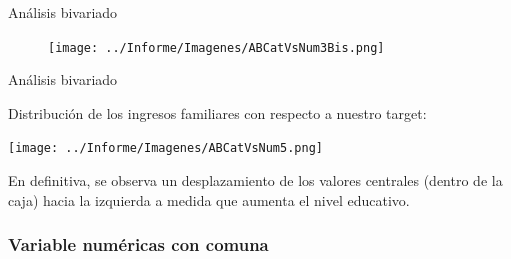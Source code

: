\documentclass[pdf]{beamer}
\begin{document}
{\begin{frame}{Análisis bivariado}
    \begin{figure}
        \texttt{[image: ../Informe/Imagenes/ABCatVsNum3Bis.png]}
    \end{figure}

\end{frame}


 
 
 




\begin{frame}{Análisis bivariado}

    Distribución de los ingresos familiares con respecto a nuestro target:

    \begin{center}
        \texttt{[image: ../Informe/Imagenes/ABCatVsNum5.png]}
    \end{center}

    En definitiva, se observa un desplazamiento de los valores centrales (dentro de la caja) hacia la izquierda a medida que aumenta el nivel educativo.


\end{frame}

    \subsubsection{Variable numéricas con comuna}

}
\end{document}
